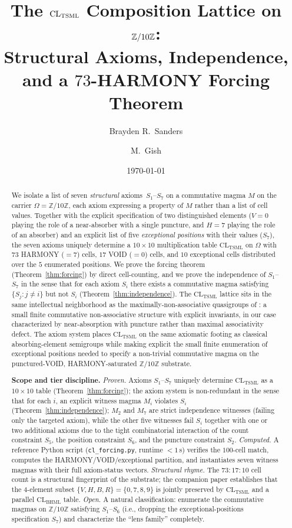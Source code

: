 \documentclass[11pt,reqno]{amsart}
\title[The $\CL_{\TSML}$ composition lattice]
{The $\CL_{\TSML}$ Composition Lattice on $\Z/10\Z$: \\
 Structural Axioms, Independence, and a $73$-HARMONY Forcing Theorem}
\author{Brayden R.\ Sanders}
\author{M.\ Gish}
\date{\today}
\theoremstyle{plain}
\theoremstyle{definition}
\theoremstyle{remark}
\newcommand{\Z}{\mathbb{Z}}
\newcommand{\TSML}{\mathrm{TSML}}
\newcommand{\BHML}{\mathrm{BHML}}
\newcommand{\CL}{\mathrm{CL}}
\begin{document}
\begin{abstract}
We isolate a list of seven \emph{structural} axioms~$S_{1}$--$S_{7}$
on a commutative magma $M$ on the carrier $\Omega = \Z/10\Z$, each
axiom expressing a property of $M$ rather than a list of cell values.
Together with the explicit specification of two distinguished
elements ($V = 0$ playing the role of a near-absorber with a single
puncture, and $H = 7$ playing the role of an absorber) and an
explicit list of five \emph{exceptional positions} with their values
($S_{7}$), the seven axioms uniquely determine a $10\times 10$
multiplication table $\CL_{\TSML}$ on $\Omega$ with $73$ HARMONY
($= 7$) cells, $17$ VOID ($= 0$) cells, and $10$ exceptional cells
distributed over the $5$ enumerated positions. We prove the forcing
theorem (Theorem~\ref{thm:forcing}) by direct cell-counting, and we
prove the independence of $S_{1}$--$S_{7}$ in the sense that for each
axiom $S_{i}$ there exists a commutative magma satisfying
$\{S_{j} : j \neq i\}$ but not $S_{i}$ (Theorem~\ref{thm:independence}).
The $\CL_{\TSML}$ lattice sits in the same intellectual neighborhood
as the maximally-non-associative quasigroups of
\cite{DrapalWanless2021}: a small finite commutative non-associative
structure with explicit invariants, in our case characterized by
near-absorption with puncture rather than maximal associativity
defect. The axiom system places $\CL_{\TSML}$ on the same axiomatic
footing as classical absorbing-element semigroups
\cite{HowieSemigroup, Clifford1961} while making explicit the small
finite enumeration of exceptional positions needed to specify a
non-trivial commutative magma on the punctured-VOID,
HARMONY-saturated $\Z/10\Z$ substrate.

\smallskip\noindent
\textbf{Scope and tier discipline.} \emph{Proven.} Axioms
$S_{1}$--$S_{7}$ uniquely determine $\CL_{\TSML}$ as a $10 \times 10$
table (Theorem~\ref{thm:forcing}); the axiom system is non-redundant
in the sense that for each $i$, an explicit witness magma
$M_{i}$ violates $S_{i}$ (Theorem~\ref{thm:independence}); $M_{2}$
and $M_{7}$ are strict independence witnesses (failing only the
targeted axiom), while the other five witnesses fail $S_{i}$
together with one or two additional axioms due to the tight
combinatorial interaction of the count constraint $S_{5}$, the
position constraint $S_{6}$, and the puncture constraint $S_{2}$.
\emph{Computed.} A reference Python script (\texttt{cl\_forcing.py},
runtime $< 1$\,s) verifies the $100$-cell match, computes the
HARMONY/VOID/exceptional partition, and instantiates seven witness
magmas with their full axiom-status vectors. \emph{Structural rhyme.} The $73:17:10$
cell count is a structural fingerprint of the substrate; the
companion paper \cite{SandersGishFourCore} establishes that the
$4$-element subset $\{V, H, B, R\} = \{0, 7, 8, 9\}$ is jointly
preserved by $\CL_{\TSML}$ and a parallel $\CL_{\BHML}$ table.
\emph{Open.} A natural classification: enumerate the commutative
magmas on $\Z/10\Z$ satisfying $S_{1}$--$S_{6}$ (i.e., dropping the
exceptional-positions specification $S_{7}$) and characterize the
``lens family'' completely.
\end{abstract}
\end{document}
